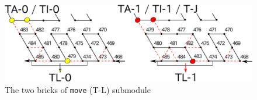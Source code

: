 \documentclass[dvipdfmx,review]{elsarticle}
\begin{document}
\begin{figure}[h]
\centering
\includegraphics[width=\linewidth]{Figs/move.png}
\caption{The two bricks of \texttt{move} (T-L) submodule}
\label{fig:move}
\end{figure}

\clearpage
\end{document}
